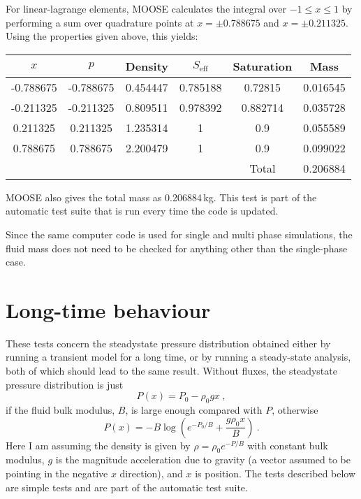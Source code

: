 \documentclass[]{scrreprt}
\begin{document}
For linear-lagrange elements, MOOSE calculates the integral over
$-1\leq x \leq 1$ by performing a sum over quadrature points at
$x=\pm 0.788675$ and $x=\pm 0.211325$.
Using the properties given above, this yields:
\begin{center}
\begin{tabular}{|cccccc|}
\hline
$x$ & $p$ & Density & $S_{\mathrm{eff}}$ & Saturation & Mass \\
\hline
-0.788675 & -0.788675 & 0.454447 & 0.785188 & 0.72815 & 0.016545 \\
-0.211325 & -0.211325 & 0.809511 & 0.978392 & 0.882714 & 0.035728 \\
0.211325 & 0.211325 & 1.235314 & 1 & 0.9 & 0.055589 \\
0.788675 & 0.788675 & 2.200479 & 1 & 0.9 & 0.099022 \\
\hline
 & & & & Total & 0.206884 \\
\hline
\end{tabular}
\end{center}
MOOSE also gives the total mass as 0.206884\,kg.  This test is part of
the automatic test suite that is run every time the code is updated.

Since the same computer code is used for single and multi phase
simulations, the fluid mass does not need to be checked for anything
other than the single-phase case.





\chapter{Long-time behaviour}
\label{gh}

These tests concern the steadystate pressure distribution obtained
either by running a transient model for a long time, or by running a
steady-state analysis, both of which should lead to the same result.
Without fluxes, the steadystate pressure distribution is just
\begin{equation}
P(x) = P_{0} - \rho_{0} g x \ ,
\end{equation}
if the fluid bulk modulus, $B$, is large enough compared with $P$, otherwise
\begin{equation}
P(x) = -B \log\left( e^{-P_{0}/B} + \frac{g\rho_{0}x}{B} \right) \ .
\label{grav.head.eqn}
\end{equation}
Here I am assuming the density is given by $\rho = \rho_{0}e^{-P/B}$
with constant bulk modulus, $g$ is the
magnitude acceleration due to gravity (a vector assumed to be pointing in the
negative $x$ direction), and $x$ is position.  The tests described below
are simple tests and are part of the automatic test suite.
\end{document}
